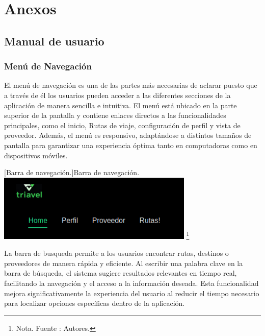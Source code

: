\section{Anexos}

\subsection{Manual de usuario}
\label{manual-usuario}
\subsubsection{Menú de Navegación}

El menú de navegación es una de las partes más necesarias de aclarar puesto que a través de él los usuarios pueden acceder a las diferentes secciones de la aplicación de manera sencilla e intuitiva. El menú está ubicado en la parte superior de la pantalla y contiene enlaces directos a las funcionalidades principales, como el inicio, Rutas de viaje, configuración de perfil y vista de proveedor. Además, el menú es responsivo, adaptándose a distintos tamaños de pantalla para garantizar una experiencia óptima tanto en computadoras como en dispositivos móviles.

 \vspace{2mm}
    \begin{minipage}{0.9\textwidth}
    \centering
    [{Barra de navegación.}]{Barra de navegación.}
    \label{ManualBarraNavegacion}
    \includegraphics[width=0.7\textwidth]{Content/Images/ManualBarraNavegacion.png}
    \footnote{Nota. \textup{Fuente : Autores.}}
    \end{minipage}



La barra de busqueda permite a los usuarios encontrar rutas, destinos o proveedores de manera rápida y eficiente. Al escribir una palabra clave en la barra de búsqueda, el sistema sugiere resultados relevantes en tiempo real, facilitando la navegación y el acceso a la información deseada. Esta funcionalidad mejora significativamente la experiencia del usuario al reducir el tiempo necesario para localizar opciones específicas dentro de la aplicación.

